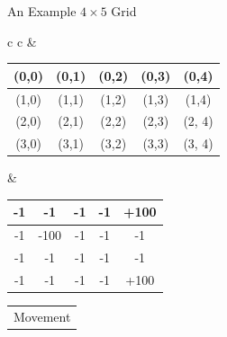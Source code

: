 \documentclass[aspectratio=169,xcolor=dvipsnames,svgnames,x11names,fleqn]{beamer}
\begin{document}
\begin{frame}{An Example $4\times 5$ Grid}
    \small
    \begin{center}
        \begin{tabular}{c c}
             &  \\
            \begin{tabular}{|c|c|c|c|c|}
            \hline
            (0,0) & (0,1) & (0,2) & (0,3) & (0,4) \\
            \hline
            (1,0) & (1,1) & (1,2) & (1,3) & (1,4) \\
            \hline
            (2,0) & (2,1) & (2,2) & (2,3)  & (2, 4)\\
            \hline
            (3,0) & (3,1) & (3,2) & (3,3)  & (3, 4)\\
            \hline
        \end{tabular}
        &
        \begin{tabular}{|c|c|c|c|c|}
        \hline
        -1 & -1 & -1 & -1 & +100 \\
        \hline
        -1 & -100 & -1 & -1 & -1\\ %
        \hline
        -1 & -1 & -1 & -1  & -1\\
        \hline
        -1 & -1 & -1 & -1 & +100 \\
        \hline
        \end{tabular}
        \end{tabular}

        \begin{tabular}{c}

        \multicolumn{1}{c}{Movement} \\


\end{tabular}
\end{center}
\end{frame}
\end{document}
